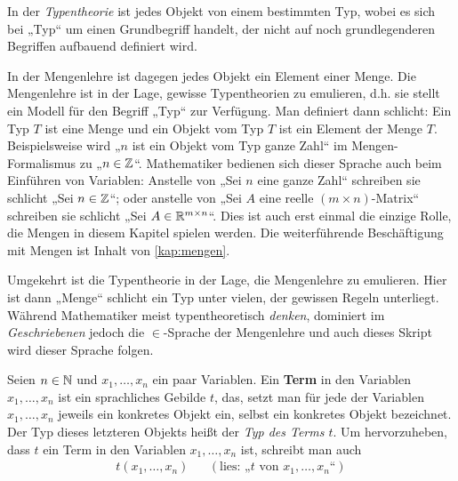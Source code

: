 \begin{bem}
    In der \emph{Typentheorie} ist jedes Objekt von einem bestimmten Typ, wobei es sich bei „Typ“ um einen Grundbegriff handelt, der nicht auf noch grundlegenderen Begriffen aufbauend definiert wird.

    In der Mengenlehre ist dagegen jedes Objekt ein Element einer Menge. Die Mengenlehre ist in der Lage, gewisse Typentheorien zu emulieren, d.h. sie stellt ein Modell für den Begriff „Typ“ zur Verfügung. Man definiert dann schlicht: Ein Typ $T$ ist eine Menge und ein Objekt vom Typ $T$ ist ein Element der Menge $T$. Beispielsweise wird „$n$ ist ein Objekt vom Typ ganze Zahl“ im Mengen-Formalismus zu „$n\in\mathbb Z$“. Mathematiker bedienen sich dieser Sprache auch beim Einführen von Variablen: Anstelle von „Sei $n$ eine ganze Zahl“ schreiben sie schlicht „Sei $n\in \mathbb Z$“; oder anstelle von „Sei $A$ eine reelle $(m\times n)$-Matrix“ schreiben sie schlicht „Sei $A\in \mathbb R^{m\times n}$“. Dies ist auch erst einmal die einzige Rolle, die Mengen in diesem Kapitel spielen werden. Die weiterführende Beschäftigung mit Mengen ist Inhalt von \cref{kap:mengen}.

    Umgekehrt ist die Typentheorie in der Lage, die Mengenlehre zu emulieren. Hier ist dann „Menge“ schlicht ein Typ unter vielen, der gewissen Regeln unterliegt. Während Mathematiker meist typentheoretisch \emph{denken}, dominiert im \emph{Geschriebenen} jedoch die $\in$-Sprache der Mengenlehre und auch dieses Skript wird dieser Sprache folgen.%
\end{bem}


\begin{defin}[Term] \label{def:term} 
    Seien $n\in \mathbb N$ und $x_1,\dots , x_n$ ein paar Variablen. Ein \textbf{Term} in den Variablen $x_1,\dots , x_n$ ist ein sprachliches Gebilde $t$, das, setzt man für jede der Variablen $x_1,\dots ,x_n$ jeweils ein konkretes Objekt ein, selbst ein konkretes Objekt bezeichnet. Der Typ dieses letzteren Objekts heißt der \emph{Typ des Terms $t$}. Um hervorzuheben, dass $t$ ein Term in den Variablen $x_1,\dots , x_n$ ist, schreibt man auch
    \begin{align*}
        t(x_1,\dots , x_n) && (\text{lies: „$t$ von $x_1,\dots , x_n$“})
    \end{align*}

\end{defin}


